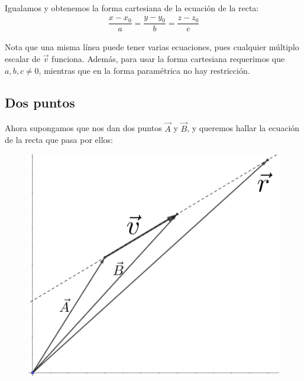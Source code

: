 \documentclass[12pt, fleqn]{report}                             %
\begin{document}
        	Igualamos y obtenemos la forma cartesiana de la ecuación de la recta:
        	\begin{align}
	        	\dfrac{x - x_0}{a} = \dfrac{y - y_0}{b} = \dfrac{z - z_0}{c} \label{lineEquation1}
        	\end{align}
        	
        	Nota que una misma línea puede tener varias ecuaciones, pues cualquier múltiplo escalar de $\vec{v}$ funciona. Además, para usar la forma cartesiana requerimos que $a,b,c\neq 0$, mientras que en la forma paramétrica no hay restricción.
        	
        	
        	\subsection{Dos puntos}
        	
        	Ahora supongamos que nos dan dos puntos $\vec{A}$ y $\vec{B}$, y queremos hallar la ecuación de la recta que pasa por ellos:
        	
        	\begin{figure}[H]
        		\centering
        		\includegraphics[scale=1.2]{line2.png}
        	\end{figure}
        
\end{document}

